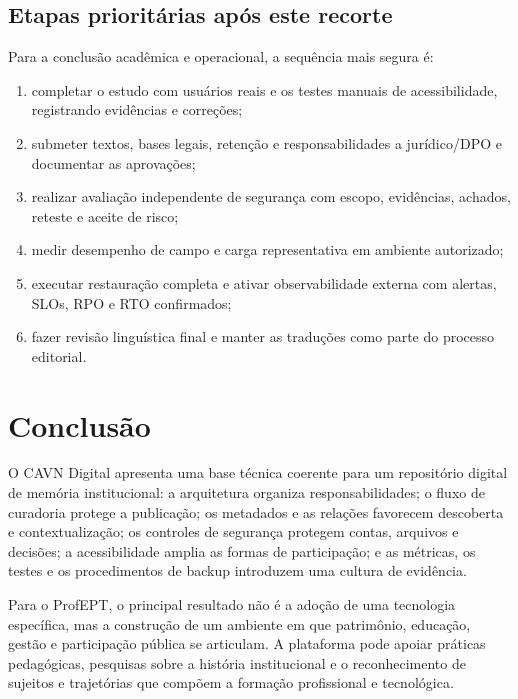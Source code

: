 \documentclass[11pt,a4paper]{article}
\begin{document}
\subsection{Etapas prioritárias após este recorte}

Para a conclusão acadêmica e operacional, a sequência mais segura é:

\begin{enumerate}
  \item completar o estudo com usuários reais e os testes manuais de acessibilidade, registrando evidências e correções;
  \item submeter textos, bases legais, retenção e responsabilidades a jurídico/DPO e documentar as aprovações;
  \item realizar avaliação independente de segurança com escopo, evidências, achados, reteste e aceite de risco;
  \item medir desempenho de campo e carga representativa em ambiente autorizado;
  \item executar restauração completa e ativar observabilidade externa com alertas, SLOs, RPO e RTO confirmados;
  \item fazer revisão linguística final e manter as traduções como parte do processo editorial.
\end{enumerate}

\section{Conclusão}

O CAVN Digital apresenta uma base técnica coerente para um repositório digital de memória institucional: a arquitetura organiza responsabilidades; o fluxo de curadoria protege a publicação; os metadados e as relações favorecem descoberta e contextualização; os controles de segurança protegem contas, arquivos e decisões; a acessibilidade amplia as formas de participação; e as métricas, os testes e os procedimentos de backup introduzem uma cultura de evidência.

Para o ProfEPT, o principal resultado não é a adoção de uma tecnologia específica, mas a construção de um ambiente em que patrimônio, educação, gestão e participação pública se articulam. A plataforma pode apoiar práticas pedagógicas, pesquisas sobre a história institucional e o reconhecimento de sujeitos e trajetórias que compõem a formação profissional e tecnológica.
\end{document}
